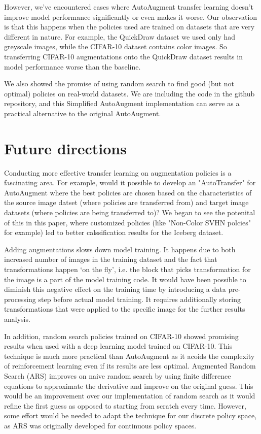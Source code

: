 \documentclass[10pt,twocolumn,letterpaper]{article}
\begin{document}
However, we’ve encountered cases where AutoAugment transfer learning doesn’t improve model performance significantly or even makes it worse. Our observation is that this happens when the policies used are trained on datasets that are very different in nature. For example, the QuickDraw dataset we used only had greyscale images, while the CIFAR-10 dataset contains color images. So transferring CIFAR-10 augmentations onto the QuickDraw dataset results in model performance worse than the baseline.

We also showed the promise of using random search to find good (but not optimal) policies on real-world datasets.  We are including the code in the github repository, and this Simplified AutoAugment implementation can serve as a practical alternative to the original AutoAugment.

\section{Future directions}

Conducting more effective transfer learning on augmentation policies is a fascinating area.  For example, would it possible to develop an "AutoTransfer" for AutoAugment where the best policies are chosen based on the characteristics of the source image datset (where policies are transferred from) and target image datasets (where policies are being transferred to)?  We began to see the potenital of this in this paper, where customized policies (like "Non-Color SVHN polcies" for example) led to better calssification results for the Iceberg dataset. 

Adding augmentations slows down model training. It happens due to both increased number of images in the training dataset and the fact that transformations happen ‘on the fly’, i.e. the block that picks transformation for the image is a part of the model training code. It would have been possible to diminish this negative effect on the training time by introducing a data pre-processing step before actual model training. It requires additionally storing transformations that were applied to the specific image for the further results analysis.

In addition, random search policies trained on CIFAR-10 showed promising results when used with a deep learning model trained on CIFAR-10. This technique is much more practical than AutoAugment as it acoids the complexity of reinforcement learning even if its results are less optimal. Augmented Random Search (ARS) improves on naive random search by using finite difference equations to approximate the derivative and improve on the original guess. This would be an improvement over our implementation of random search as it would refine the first guess as opposed to starting from scratch every time. However, some effort would be needed to adapt the technique for our discrete policy space, as ARS was originally developed for continuous policy spaces.
\end{document}
